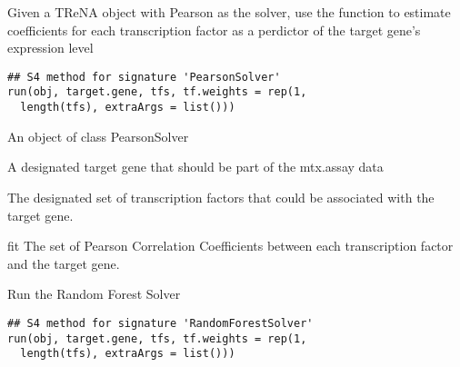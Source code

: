 \documentclass[a4paper]{book}
\begin{document}
%
\begin{Description}\relax
Given a TReNA object with Pearson as the solver, use the  function to
estimate coefficients for each transcription factor as a perdictor of the target gene's expression level
\end{Description}
%
\begin{Usage}
\begin{verbatim}
## S4 method for signature 'PearsonSolver'
run(obj, target.gene, tfs, tf.weights = rep(1,
  length(tfs), extraArgs = list()))
\end{verbatim}
\end{Usage}
%
\begin{Arguments}
\begin{ldescription}
\item[\code{obj}] An object of class PearsonSolver

\item[\code{target.gene}] A designated target gene that should be part of the mtx.assay data

\item[\code{tfs}] The designated set of transcription factors that could be associated with the target gene.
\end{ldescription}
\end{Arguments}
%
\begin{Value}
fit The set of Pearson Correlation Coefficients between each transcription factor and the target gene.
\end{Value}
%
\begin{SeeAlso}\relax
{}
\end{SeeAlso}
%
\begin{Description}\relax
Run the Random Forest Solver
\end{Description}
%
\begin{Usage}
\begin{verbatim}
## S4 method for signature 'RandomForestSolver'
run(obj, target.gene, tfs, tf.weights = rep(1,
  length(tfs), extraArgs = list()))
\end{verbatim}
\end{Usage}
\end{document}
